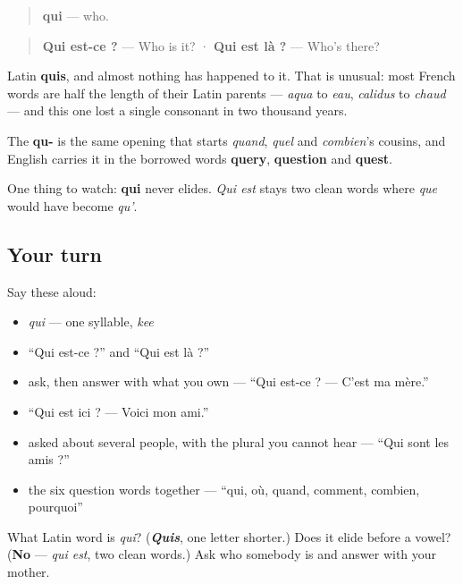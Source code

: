 \begin{cousinweb}
\begin{quote}
\textbf{qui} — who.
\end{quote}

\begin{quote}
\textbf{Qui est-ce ?} — Who is it? · \textbf{Qui est là ?} — Who's there?
\end{quote}

Latin \textbf{quis}, and almost nothing has happened to it. That is unusual: most French words are half the length of their Latin parents — \emph{aqua} to \emph{eau}, \emph{calidus} to \emph{chaud} — and this one lost a single consonant in two thousand years.

The \textbf{qu-} is the same opening that starts \emph{quand}, \emph{quel} and \emph{combien}'s cousins, and English carries it in the borrowed words \textbf{query}, \textbf{question} and \textbf{quest}.

One thing to watch: \textbf{qui} never elides. \emph{Qui est} stays two clean words where \emph{que} would have become \emph{qu'}.
\end{cousinweb}

\subsection*{Your turn}
Say these aloud:

\begin{itemize}
\raggedright
  \item \emph{qui} — one syllable, \emph{kee}
  \item \textquotedblleft{}Qui est-ce ?\textquotedblright{} and \textquotedblleft{}Qui est là ?\textquotedblright{}
  \item ask, then answer with what you own — \textquotedblleft{}Qui est-ce ? — C'est ma mère.\textquotedblright{}
  \item \textquotedblleft{}Qui est ici ? — Voici mon ami.\textquotedblright{}
  \item asked about several people, with the plural you cannot hear — \textquotedblleft{}Qui sont les amis ?\textquotedblright{}
  \item the six question words together — \textquotedblleft{}qui, où, quand, comment, combien, pourquoi\textquotedblright{}
\end{itemize}

\begin{tcolorbox}[breakable,colback=teal!4,colframe=teal!35!black,title={Before you move on}]
What Latin word is \emph{qui}? (\emph{\textbf{Quis}}, one letter shorter.) Does it elide before a vowel? (\textbf{No} — \emph{qui est}, two clean words.) Ask who somebody is and answer with your mother.
\end{tcolorbox}
